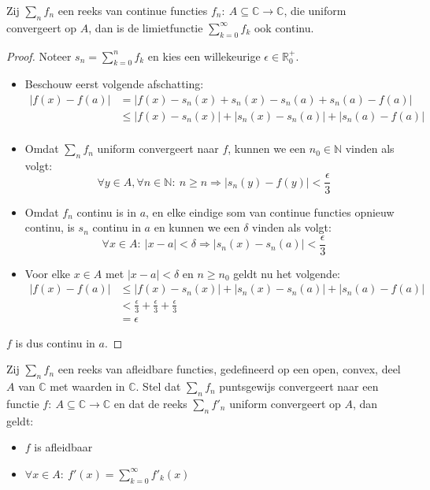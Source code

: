 \documentclass[main.tex]{subfiles}
\begin{document}
\begin{bpr}
  \label{pr:reeks-uniform-convergent-dan-limietfunctie-continu}
  Zij $\sum_{n}f_{n}$ een reeks van continue functies $f_{n}:\ A \subseteq \mathbb{C} \rightarrow \mathbb{C}$, die uniform convergeert op $A$, dan is de limietfunctie $\sum_{k=0}^{\infty}f_{k}$ ook continu.

  \begin{proof}
    Noteer $s_{n} = \sum_{k=0}^{n}f_{k}$ en kies een willekeurige $\epsilon \in \mathbb{R}_{0}^{+}$.
    \begin{itemize}
    \item Beschouw eerst volgende afschatting:
      \[
      \begin{array}{rl}
        |f(x)-f(a)| &= |f(x) - s_{n}(x) + s_{n}(x) - s_{n}(a) + s_{n}(a) - f(a)|\\
        &\le |f(x) - s_{n}(x)| + |s_{n}(x) - s_{n}(a)| + |s_{n}(a) - f(a)|\\
      \end{array}
      \]
    \item Omdat $\sum_{n}f_{n}$ uniform convergeert naar $f$, kunnen we een $n_{0}\in \mathbb{N}$ vinden als volgt:
      \[ \forall y \in A, \forall n\in \mathbb{N}:\ n\ge n \Rightarrow |s_{n}(y)-f(y)|<\frac{\epsilon}{3} \]
    \item Omdat $f_{n}$ continu is in $a$, en elke eindige som van continue functies opnieuw continu\waarom, is $s_{n}$ continu in $a$ en kunnen we een $\delta$ vinden als volgt:
      \[ \forall x\in A:\ |x-a| <\delta \Rightarrow |s_{n}(x) - s_{n}(a)| < \frac{\epsilon}{3} \]
    \item 
      Voor elke $x\in A$ met $|x-a|<\delta$ en $n\ge n_{0}$ geldt nu het volgende:
      \[
      \begin{array}{rl}
        |f(x)-f(a)| &\le |f(x) - s_{n}(x)| + |s_{n}(x) - s_{n}(a)| + |s_{n}(a) - f(a)|\\
        &< \frac{\epsilon}{3} + \frac{\epsilon}{3} + \frac{\epsilon}{3}\\
        &= \epsilon
      \end{array}
      \]
    \end{itemize}
    $f$ is dus continu in $a$.
\feed
  \end{proof}
\end{bpr}

\begin{bpr}
  \label{pr:reeks-uniform-convergent-etc-dan-limietfunctie-afleidbaar}
  Zij $\sum_{n}f_{n}$ een reeks van afleidbare functies, gedefineerd op een open, convex, deel $A$ van $\mathbb{C}$ met waarden in $\mathbb{C}$.
  Stel dat $\sum_{n}f_{n}$ puntsgewijs convergeert naar een functie $f:\ A\subseteq \mathbb{C} \rightarrow \mathbb{C}$ en dat de reeks $\sum_{n}f'_{n}$ uniform convergeert op $A$, dan geldt:
  \begin{itemize}
  \item $f$ is afleidbaar
  \item $\forall x\in A:\ f'(x) = \sum_{k=0}^{\infty}f'_{k}(x)$
  \end{itemize}
\end{bpr}
\end{document}
